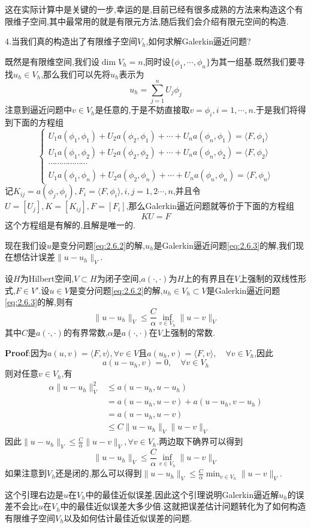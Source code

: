 这在实际计算中是关键的一步,幸运的是,目前已经有很多成熟的方法来构造这个有限维子空间,其中最常用的就是有限元方法,随后我们会介绍有限元空间的构造.\par
4.当我们真的构造出了有限维子空间$V_h$,如何求解Galerkin逼近问题?\par
既然是有限维空间,我们设$\operatorname{dim}V_h=n$,同时设$\{\phi_1,\cdots,\phi_n\}$为其一组基.既然我们要寻找$u_h\in V_h$,那么我们可以先将$u_h$表示为
$$
u_h=\sum_{j=1}^nU_j\phi_j
$$
注意到逼近问题中$v\in V_h$是任意的,于是不妨直接取$v=\phi_i,i=1,\cdots,n$.于是我们将得到下面的方程组
$$
\begin{cases}
    U_1a(\phi_1,\phi_1)+U_2a(\phi_2,\phi_1)+\cdots+U_na(\phi_n,\phi_1)=\langle F,\phi_1\rangle\\
    U_1a(\phi_1,\phi_2)+U_2a(\phi_2,\phi_2)+\cdots+U_na(\phi_n,\phi_2)=\langle F,\phi_2\rangle\\
    \cdots\cdots\cdots\cdots\cdots\cdots\\
    U_1a(\phi_1,\phi_n)+U_2a(\phi_2,\phi_n)+\cdots+U_na(\phi_n,\phi_n)=\langle F,\phi_n\rangle
\end{cases}
$$
记$K_{ij}=a(\phi_j,\phi_i),F_i=\langle F,\phi_i\rangle,i,j=1,2\cdots,n$,并且令$U=[U_j],K=[K_{ij}],F=[F_i]$,那么Galerkin逼近问题就等价于下面的方程组
$$
KU=F
$$
这个方程组是有解的,且解是唯一的.\par
现在我们设$u$是变分问题\eqref{eq:2.6.2}的解,$u_h$是Galerkin逼近问题\eqref{eq:2.6.3}的解,我们现在想估计误差$\|u-u_h\|_V$.
\begin{tcolorbox}[colback=KuangNei,colframe=BianKuang,title=\textbf{Céa引理},sharpish corners]
    设$H$为Hilbert空间,$V\subset H$为闭子空间,$a(\cdot,\cdot)$为$H$上的有界且在$V$上强制的双线性形式,$F\in V'$.设$u\in V$是变分问题\eqref{eq:2.6.2}的解,$u_h\in V_h\subset V$是Galerkin逼近问题\eqref{eq:2.6.3}的解,则有
    $$
    \|u-u_h\|_V\leqslant \frac{C}{\alpha}\inf_{v\in V_h}\|u-v\|_V
    $$
    其中$C$是$a(\cdot,\cdot)$的有界常数,$\alpha$是$a(\cdot,\cdot)$在$V$上强制的常数.
\end{tcolorbox}
\textbf{Proof}:因为$a(u,v)=\langle F,v\rangle,\forall v\in V$且$a(u_h,v)=\langle F,v\rangle,\quad \forall v\in V_h$,因此
$$
a(u-u_h,v)=0,\quad \forall v\in V_h
$$
则对任意$v\in V_h$,有
$$
\begin{aligned}
    \alpha \|u-u_h\|^2_V &\leqslant a(u-u_h,u-u_h)\\
                         &=a(u-u_h,u-v)+a(u-u_h,v-u_h)\\
                         &= a(u-u_h,u-v)\\
                         &\leqslant C\|u-u_h\|_V\|u-v\|_V
\end{aligned}
$$
因此$\|u-u_h\|_V\leqslant \frac{C}{\alpha}\|u-v\|_V,\forall v\in V_h$.两边取下确界可以得到
$$
\|u-u_h\|_V\leqslant \frac{C}{\alpha}\inf_{v\in V_h}\|u-v\|_V
$$
如果注意到$V_h$还是闭的,那么可以得到$\|u-u_h\|_V\leqslant \frac{C}{\alpha}\min_{v\in V_h}\|u-v\|_V$.\par
这个引理右边是$u$在$V_h$中的最佳近似误差,因此这个引理说明Galerkin逼近解$u_h$的误差不会比$u$在$V_h$中的最佳近似误差大多少倍.这就把误差估计问题转化为了如何构造有限维子空间$V_h$以及如何估计最佳近似误差的问题.\par
